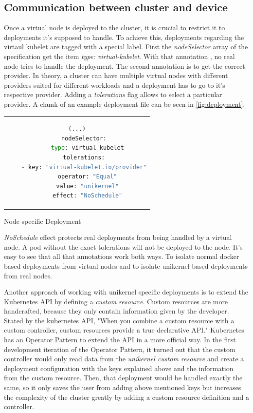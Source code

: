 \subsection{Communication between cluster and device}
Once a virtual node is deployed to the cluster, it is crucial to restrict it to deployments it's supposed to handle. To achieve this, deployments regarding the virtaul kubelet are tagged with a special label. First the \textit{nodeSelector} array of the specification get the item \textit{type: virtual-kubelet}. With that annotation , no real node tries to handle the deployment. The second annotation is to get the correct provider. In theory, a cluster can have multiple virtual nodes with different providers suited for different workloads and a deployment has to go to it's respective provider. Adding a \textit{tolerations} flag allows to select a particular provider. A chunk of an example deployment file can be seen in \ref{fig:deployment}.

\begin{code}[htpb]
  \centering
  \begin{tabular}{c}
  \begin{lstlisting}[language=python]
    (...)
    nodeSelector:
      type: virtual-kubelet
    tolerations:
    - key: "virtual-kubelet.io/provider"
      operator: "Equal"
      value: "unikernel"
      effect: "NoSchedule"
\end{lstlisting}
\end{tabular}
\caption{Node specific Deployment}\label{fig:deployment}
\end{code}
\textit{NoSchedule} effect protects real deployments from being handled by a virtual node. A pod without the exact tolerations will not be deployed to the node. It's easy to see that all that annotations work both ways. To isolate normal docker based deployments from virtual nodes and to isolate unikernel based deployments from real nodes.

Another approach of working with unikernel specific deployments is to extend the Kubernetes API by defining a \textit{custom resource}. Custom resources are more handcrafted, because they only contain information given by the developer. Stated by the kubernetes API, "When you combine a custom resource with a custom controller, custom resources provide a true declarative API." Kubernetes has an Operator Pattern to extend the API in a more official way. In the first development iteration of the Operator Pattern, it turned out that the custom controller would only read data from the \textit{unikernel custom resource} and create a deployment configuration with the keys explained above and the information from the custom resource. Then, that deployment would be handled exactly the same, so it only saves the user from adding above mentioned keys but increases the complexity of the cluster greatly by adding a custom resource definition and a controller.

